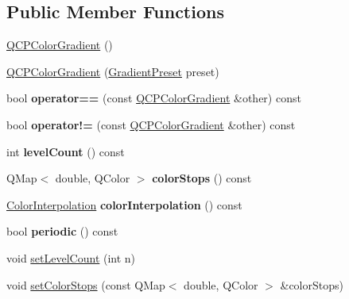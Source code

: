 \subsection*{Public Member Functions}
\begin{DoxyCompactItemize}
\item 
\hyperlink{class_q_c_p_color_gradient_a96bcc490ff9dc32b22941ce00800bce0}{Q\+C\+P\+Color\+Gradient} ()
\item 
\hyperlink{class_q_c_p_color_gradient_a4e570b4004fd60bd135e52d685ed2b66}{Q\+C\+P\+Color\+Gradient} (\hyperlink{class_q_c_p_color_gradient_aed6569828fee337023670272910c9072}{Gradient\+Preset} preset)
\item 
\mbox{\label{class_q_c_p_color_gradient_a7f3478c33c59aa3c03b9ea1f809877fa}} 
bool {\bfseries operator==} (const \hyperlink{class_q_c_p_color_gradient}{Q\+C\+P\+Color\+Gradient} \&other) const
\item 
\mbox{\label{class_q_c_p_color_gradient_ad26a10e3beaef4fc6f2553d1a9756087}} 
bool {\bfseries operator!=} (const \hyperlink{class_q_c_p_color_gradient}{Q\+C\+P\+Color\+Gradient} \&other) const
\item 
\mbox{\label{class_q_c_p_color_gradient_ac4b9d7034fc3b6c76318b05075367090}} 
int {\bfseries level\+Count} () const
\item 
\mbox{\label{class_q_c_p_color_gradient_aaab19729e921682401044ac8e518ff02}} 
Q\+Map$<$ double, Q\+Color $>$ {\bfseries color\+Stops} () const
\item 
\mbox{\label{class_q_c_p_color_gradient_abad5002858db8cf75ecb045200881de6}} 
\hyperlink{class_q_c_p_color_gradient_ac5dca17cc24336e6ca176610e7f77fc1}{Color\+Interpolation} {\bfseries color\+Interpolation} () const
\item 
\mbox{\label{class_q_c_p_color_gradient_a22a1d2b17f203caf0dcec833507fb9e0}} 
bool {\bfseries periodic} () const
\item 
void \hyperlink{class_q_c_p_color_gradient_a18da587eb4f7fc788ea28ba15b6a12de}{set\+Level\+Count} (int n)
\item 
void \hyperlink{class_q_c_p_color_gradient_a724e828aa6f0ba5011a9392477c35d3a}{set\+Color\+Stops} (const Q\+Map$<$ double, Q\+Color $>$ \&color\+Stops)

\end{DoxyCompactItemize}
